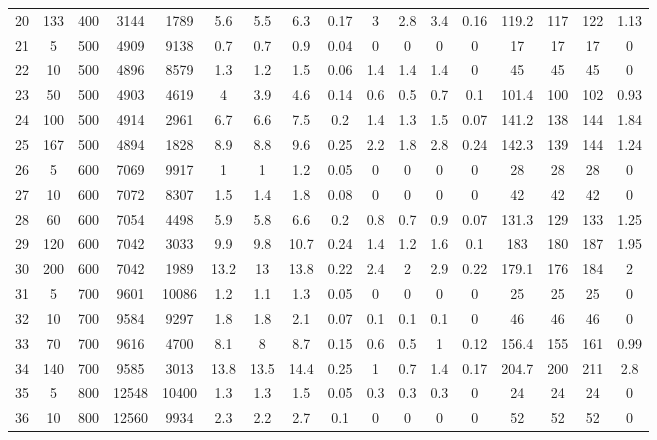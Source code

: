 \documentclass[11pt]{article}
\newcommand{\np}{\newpage}
\begin{document}
\begin{landscape}
\begin{longtable}[c]{ccccc|cccc|cccc|cccc}
		20 & 133 & 400 & 3144 & 1789 & 5.6 & 5.5 & 6.3 & 0.17 & 3 & 2.8 & 3.4 & 0.16 & 119.2 & 117 & 122 & 1.13 \\ \np
		\rowcolor[HTML]{EFEFEF} 
		21 & 5 & 500 & 4909 & 9138 & 0.7 & 0.7 & 0.9 & 0.04 & 0 & 0 & 0 & 0 & 17 & 17 & 17 & 0 \\
		\rowcolor[HTML]{EFEFEF} 
		22 & 10 & 500 & 4896 & 8579 & 1.3 & 1.2 & 1.5 & 0.06 & 1.4 & 1.4 & 1.4 & 0 & 45 & 45 & 45 & 0 \\
		\rowcolor[HTML]{EFEFEF} 
		23 & 50 & 500 & 4903 & 4619 & 4 & 3.9 & 4.6 & 0.14 & 0.6 & 0.5 & 0.7 & 0.1 & 101.4 & 100 & 102 & 0.93 \\
		\rowcolor[HTML]{EFEFEF} 
		24 & 100 & 500 & 4914 & 2961 & 6.7 & 6.6 & 7.5 & 0.2 & 1.4 & 1.3 & 1.5 & 0.07 & 141.2 & 138 & 144 & 1.84 \\
		\rowcolor[HTML]{EFEFEF} 
		25 & 167 & 500 & 4894 & 1828 & 8.9 & 8.8 & 9.6 & 0.25 & 2.2 & 1.8 & 2.8 & 0.24 & 142.3 & 139 & 144 & 1.24 \\
		26 & 5 & 600 & 7069 & 9917 & 1 & 1 & 1.2 & 0.05 & 0 & 0 & 0 & 0 & 28 & 28 & 28 & 0 \\
		27 & 10 & 600 & 7072 & 8307 & 1.5 & 1.4 & 1.8 & 0.08 & 0 & 0 & 0 & 0 & 42 & 42 & 42 & 0 \\
		28 & 60 & 600 & 7054 & 4498 & 5.9 & 5.8 & 6.6 & 0.2 & 0.8 & 0.7 & 0.9 & 0.07 & 131.3 & 129 & 133 & 1.25 \\
		29 & 120 & 600 & 7042 & 3033 & 9.9 & 9.8 & 10.7 & 0.24 & 1.4 & 1.2 & 1.6 & 0.1 & 183 & 180 & 187 & 1.95 \\
		30 & 200 & 600 & 7042 & 1989 & 13.2 & 13 & 13.8 & 0.22 & 2.4 & 2 & 2.9 & 0.22 & 179.1 & 176 & 184 & 2 \\
		\rowcolor[HTML]{EFEFEF} 
		31 & 5 & 700 & 9601 & 10086 & 1.2 & 1.1 & 1.3 & 0.05 & 0 & 0 & 0 & 0 & 25 & 25 & 25 & 0 \\
		\rowcolor[HTML]{EFEFEF} 
		32 & 10 & 700 & 9584 & 9297 & 1.8 & 1.8 & 2.1 & 0.07 & 0.1 & 0.1 & 0.1 & 0 & 46 & 46 & 46 & 0 \\
		\rowcolor[HTML]{EFEFEF} 
		33 & 70 & 700 & 9616 & 4700 & 8.1 & 8 & 8.7 & 0.15 & 0.6 & 0.5 & 1 & 0.12 & 156.4 & 155 & 161 & 0.99 \\
		\rowcolor[HTML]{EFEFEF} 
		34 & 140 & 700 & 9585 & 3013 & 13.8 & 13.5 & 14.4 & 0.25 & 1 & 0.7 & 1.4 & 0.17 & 204.7 & 200 & 211 & 2.8 \\
		35 & 5 & 800 & 12548 & 10400 & 1.3 & 1.3 & 1.5 & 0.05 & 0.3 & 0.3 & 0.3 & 0 & 24 & 24 & 24 & 0 \\
		36 & 10 & 800 & 12560 & 9934 & 2.3 & 2.2 & 2.7 & 0.1 & 0 & 0 & 0 & 0 & 52 & 52 & 52 & 0 \\

\end{longtable}
\end{landscape}
\end{document}
